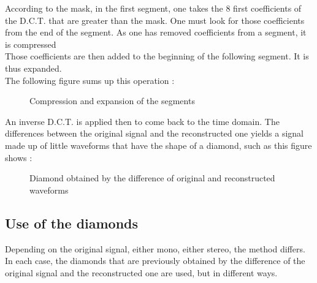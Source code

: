 According to the mask, in the first segment, one takes the 8 first coefficients of the D.C.T. that are greater than the mask. One must look for those coefficients from the end of the segment. As one has removed coefficients from a segment, it is compressed\\
Those coefficients are then added to the beginning of the following segment. It is thus expanded.\\
The following figure sums up this operation :
\begin{figure}[H]
\caption{\label{compression-expansion} Compression and expansion of the segments}
\end{figure}

An inverse D.C.T. is applied then to come back to the time domain. The differences between the original signal and the reconstructed one yields a signal made up of little waveforms that have the shape of a diamond, such as this figure shows :
\begin{figure}[H]
\caption{\label{diamond} Diamond obtained by the difference of original and reconstructed waveforms}
\end{figure}

\subsection{Use of the diamonds}
Depending on the original signal, either mono, either stereo, the method differs. In each case, the diamonds that are previously obtained by the difference of the original signal and the reconstructed one are used, but in different ways.

